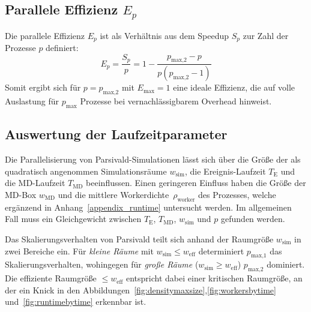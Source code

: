 \subsection{Parallele Effizienz \texorpdfstring{$E_p$}{Ep}}

Die parallele Effizienz $E_p$ ist als Verhältnis aus dem Speedup $S_p$ zur Zahl der Prozesse $p$ definiert:
\begin{equation}
  E_p = \frac{S_p}{p} = 1 - \frac{p_\text{max,2} - p}{p (p_\text{max,2} - 1)}
\end{equation}
Somit ergibt sich für $p = p_\text{max,2}$ mit $E_\text{max} = 1$ eine ideale Effizienz, die auf volle Auslastung für $p_\text{max}$ Prozesse bei vernachlässigbarem Overhead hinweist.



\subsection{Auswertung der Laufzeitparameter}
\label{runtimeanalysis}

Die Parallelisierung von Parsivald-Simulationen lässt sich über die Größe der als quadratisch angenommen Simulationsräume $w_\text{sim}$, die Ereignis-Laufzeit $T_\text{E}$ und die MD-Laufzeit $T_\text{MD}$ beeinflussen.
Einen geringeren Einfluss haben die Größe der MD-Box $w_\text{MD}$ und die mittlere Workerdichte~$\rho_\text{worker}$ des Prozesses, welche ergänzend in Anhang~\ref{appendix_runtime} untersucht werden.
Im allgemeinen Fall muss ein Gleichgewicht zwischen $T_\text{E}$, $T_\text{MD}$, $w_\text{sim}$ und $p$ gefunden werden.

Das Skalierungsverhalten von Parsivald teilt sich anhand der Raumgröße $w_\text{sim}$ in zwei Bereiche ein.
Für \textit{kleine Räume} mit $w_\text{sim} \le w_\text{eff}$ determiniert $p_\text{max,1}$ das Skalierungsverhalten, wohingegen für \textit{große Räume} ($w_\text{sim} \ge w_\text{eff}$) $p_\text{max,2}$ dominiert.
Die effiziente Raumgröße $\le w_\text{eff}$ entspricht dabei einer kritischen Raumgröße, an der ein Knick in den Abbildungen~\ref{fig:densitymaxsize},\ref{fig:workersbytime} und~\ref{fig:runtimebytime} erkennbar ist.

